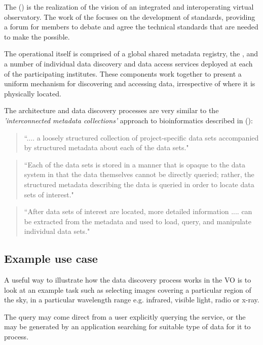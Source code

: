 \documentclass{article}
\begin{document}
The  (\cite{vo}) is the realization of the \cite{ivoa} vision
of an integrated and interoperating virtual observatory.
The work of the \cite{ivoa} focuses on the development of standards,
providing a forum for members to debate and agree the technical standards
that are needed to make the \cite{vo} possible.

The operational \cite{vo} itself is comprised of a global shared metadata
registry, the \cite{ivoa-reg}, and a number of individual data discovery
and data access services deployed at each of the participating institutes.
These components work together to present a uniform mechanism for discovering
and accessing data, irrespective of where it is physically located.

The \cite{vo} architecture and data discovery processes are very similar to
the \textit{'interconnected metadata collections'} approach to bioinformatics
described in  (\cite{jones-2006}):
\begin{quote}
``.... a loosely structured collection of project-specific data sets
accompanied by structured metadata about each of the data sets."
\end{quote}

\begin{quote}
``Each of the data sets is stored in a manner that is opaque to the data
system in that the data themselves cannot be directly queried; rather,
the structured metadata describing the data is queried in order to locate
data sets of interest."
\end{quote}

\begin{quote}
``After data sets of interest are located, more detailed information .... can
be extracted from the metadata and used to load, query, and manipulate
individual data sets."
\end{quote}

\subsection{Example use case}

A useful way to illustrate how the data discovery process works in the VO
is to look at an example task such as selecting images covering a particular
region of the sky, in a particular wavelength range e.g. infrared, visible light,
radio or x-ray.

The query may come direct from a user explicitly querying the service, or the
may be generated by an application searching for suitable type of data for it
to process.  
\end{document}
